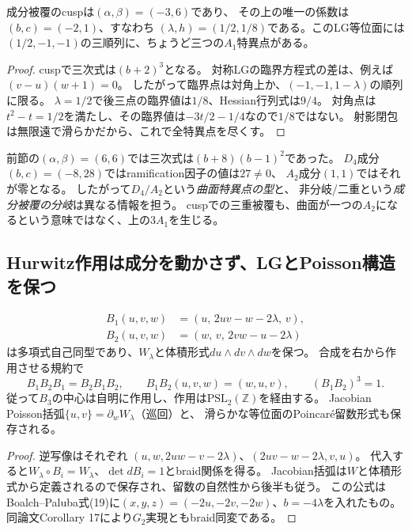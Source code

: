 \begin{corollary}[三重成分と$3A_1$曲面]
\label{cor:g2-cusp-three-nodes}
成分被覆のcuspは$(\alpha,\beta)=(-3,6)$であり、
その上の唯一の係数は$(b,c)=(-2,1)$、すなわち
$(\lambda,h)=(1/2,1/8)$である。このLG等位面には
$(1/2,-1,-1)$の三順列に、ちょうど三つの$A_1$特異点がある。
\end{corollary}
\begin{proof}
cuspで三次式は$(b+2)^3$となる。
対称LGの臨界方程式の差は、例えば$(v-u)(w+1)=0$。
したがって臨界点は対角上か、$(-1,-1,1-\lambda)$の順列に限る。
$\lambda=1/2$で後三点の臨界値は$1/8$、Hessian行列式は$9/4$。
対角点は$t^2-t=1/2$を満たし、その臨界値は$-3t/2-1/4$なので$1/8$ではない。
射影閉包は無限遠で滑らかだから、これで全特異点を尽くす。
\end{proof}

前節の$(\alpha,\beta)=(6,6)$では三次式は$(b+8)(b-1)^2$であった。
$D_4$成分$(b,c)=(-8,28)$ではramification因子の値は$27\ne0$、
$A_2$成分$(1,1)$ではそれが零となる。
したがって$D_4/A_2$という\emph{曲面特異点の型}と、
非分岐/二重という\emph{成分被覆の分岐}は異なる情報を担う。
cuspでの三重被覆も、曲面が一つの$A_2$になるという意味ではなく、上の$3A_1$を生じる。

\subsection{Hurwitz作用は成分を動かさず、LGとPoisson構造を保つ}
\begin{proposition}[LG座標での二生成元]
\label{prop:lg-hurwitz-explicit}
\begin{align*}
 B_1(u,v,w)&=(u,\,2uv-w-2\lambda,\,v),\\
 B_2(u,v,w)&=(w,\,v,\,2vw-u-2\lambda)
\end{align*}
は多項式自己同型であり、$W_\lambda$と体積形式$du\wedge dv\wedge dw$を保つ。
合成を右から作用させる規約で
\[
 B_1B_2B_1=B_2B_1B_2,\qquad B_1B_2(u,v,w)=(w,u,v),
 \qquad(B_1B_2)^3=1.
\]
従って$B_3$の中心は自明に作用し、作用は$\mathrm{PSL}_2(\mathbb Z)$を経由する。
Jacobian Poisson括弧$\{u,v\}=\partial_w W_\lambda$（巡回）と、
滑らかな等位面のPoincar\'e留数形式も保存される。
\end{proposition}
\begin{proof}
逆写像はそれぞれ
$(u,w,2uw-v-2\lambda)$、$(2uv-w-2\lambda,v,u)$。
代入すると$W_\lambda\circ B_i=W_\lambda$、$\det dB_i=1$とbraid関係を得る。
Jacobian括弧は$W$と体積形式から定義されるので保存され、留数の自然性から後半も従う。
この公式はBoalch--Paluba式(19)に$(x,y,z)=(-2u,-2v,-2w)$、$b=-4\lambda$を入れたもの。
同論文Corollary 17により$G_2$実現ともbraid同変である。
\end{proof}

